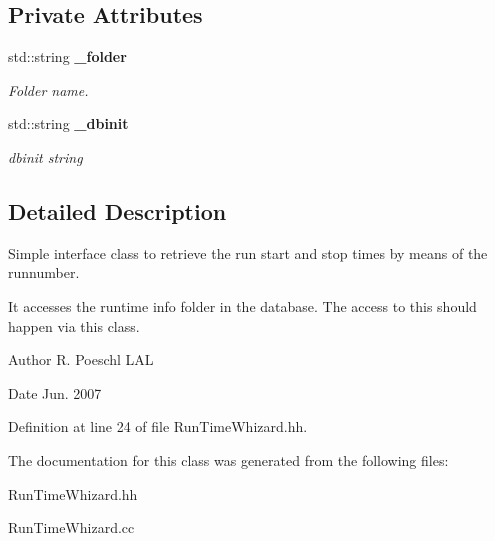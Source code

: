 \subsection*{Private Attributes}
\begin{DoxyCompactItemize}
\item 
std\-::string {\bf \-\_\-folder}\label{classCALICE_1_1RunTimeWhizard_ab91fd651f9cd8632b8209b115e5648d0}

\begin{DoxyCompactList}\small\item\em Folder name. \end{DoxyCompactList}\item 
std\-::string {\bf \-\_\-dbinit}\label{classCALICE_1_1RunTimeWhizard_a5ad19b8ae7c918d6092a929894a66410}

\begin{DoxyCompactList}\small\item\em dbinit string \end{DoxyCompactList}\end{DoxyCompactItemize}


\subsection{Detailed Description}
Simple interface class to retrieve the run start and stop times by means of the runnumber. 

It accesses the runtime info folder in the database. The access to this should happen via this class. 

\begin{DoxyAuthor}{Author}
R. Poeschl L\-A\-L 
\end{DoxyAuthor}
\begin{DoxyDate}{Date}
Jun. 2007 
\end{DoxyDate}


Definition at line 24 of file Run\-Time\-Whizard.\-hh.



The documentation for this class was generated from the following files\-:\begin{DoxyCompactItemize}
\item 
Run\-Time\-Whizard.\-hh\item 
Run\-Time\-Whizard.\-cc\end{DoxyCompactItemize}
